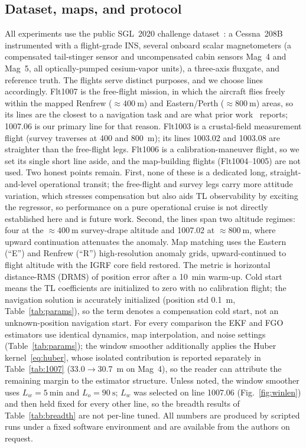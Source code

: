 \documentclass{IEEEtaes}
\begin{document}
\subsection{Dataset, maps, and protocol}
All experiments use the public SGL~2020 challenge dataset~\cite{gnadt2020}: a
Cessna~208B instrumented with a flight-grade INS, several onboard scalar
magnetometers (a compensated tail-stinger sensor and uncompensated cabin sensors
Mag~4 and Mag~5, all optically-pumped cesium-vapor units), a three-axis fluxgate,
and reference truth. The flights serve distinct purposes, and we choose lines
accordingly. Flt1007 is the free-flight mission, in which the aircraft flies freely
within the mapped Renfrew ($\approx\!\SI{400}{\meter}$) and Eastern/Perth
($\approx\!\SI{800}{\meter}$) areas, so its lines are the closest to a navigation
task and are what prior work~\cite{gnadt2020,canciani2017,hager2026} reports;
1007.06 is our primary line for that reason. Flt1003 is a crustal-field
measurement flight (survey traverses at \num{400} and \SI{800}{\meter});
its lines 1003.02 and 1003.08 are straighter than the free-flight legs. Flt1006 is
a calibration-maneuver flight, so we set its single short line aside, and the map-building flights (Flt1004--1005) are not
used. Two honest points remain. First, none of these is a dedicated long,
straight-and-level operational transit; the free-flight and survey legs carry more
attitude variation, which stresses compensation but also aids TL
observability by exciting the regressor, so
performance on a pure operational cruise is not directly established here and is
future work. Second, the lines span two altitude regimes: four at the
$\approx\!\SI{400}{\meter}$ survey-drape altitude and 1007.02 at
$\approx\!\SI{800}{\meter}$, where upward continuation attenuates the anomaly.
Map matching uses the Eastern (``E'') and Renfrew (``R'') high-resolution anomaly
grids, upward-continued to flight altitude with the IGRF core field restored. The
metric is horizontal distance-RMS (DRMS) of position error after a
\SI{10}{\minute} warm-up. Cold
start means the TL coefficients are initialized to zero with no calibration flight;
the navigation solution is accurately initialized (position std \SI{0.1}{\meter},
Table~\ref{tab:params}), so the term denotes a compensation cold start, not an
unknown-position navigation start.
For every comparison the EKF and FGO estimators use identical dynamics, map
interpolation, and noise settings (Table~\ref{tab:params}); the window smoother
additionally applies the Huber kernel~\eqref{eq:huber}, whose isolated
contribution is reported separately in Table~\ref{tab:1007}
(\num{33.0}$\rightarrow$\SI{30.7}{\meter} on Mag~4), so the reader can attribute
the remaining margin to the estimator structure. Unless noted, the window smoother
uses $L_w=\SI{5}{\minute}$ and $L_o=\SI{90}{\second}$; $L_w$ was selected on line
1007.06 (Fig.~\ref{fig:winlen}) and then held fixed for every other line, so the
breadth results of Table~\ref{tab:breadth} are not per-line tuned. All numbers are
produced by scripted runs under a fixed software environment and are available from
the authors on request.
\end{document}
